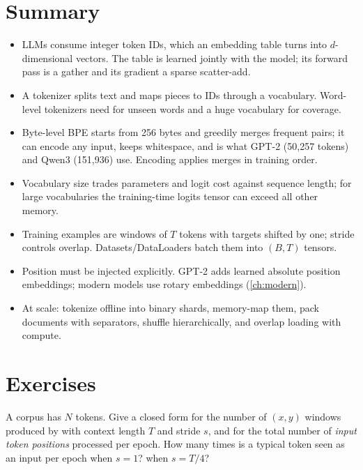 \section{Summary}\label{sec:text:summary}
\begin{itemize}
  \item LLMs consume integer token IDs, which an embedding table turns into $d$-dimensional vectors.
  The table is learned jointly with the model; its forward pass is a gather and its gradient a
  sparse scatter-add.
  \item A tokenizer splits text and maps pieces to IDs through a vocabulary. Word-level tokenizers
  need  for unseen words and a huge vocabulary for coverage.
  \item Byte-level BPE starts from 256 bytes and greedily merges frequent pairs; it can encode any
  input, keeps whitespace, and is what GPT-2 (50{,}257 tokens) and Qwen3 (151{,}936) use.
  Encoding applies merges in training order.
  \item Vocabulary size trades parameters and logit cost against sequence length; for large
  vocabularies the training-time logits tensor can exceed all other memory.
  \item Training examples are windows of $T$ tokens with targets shifted by one; stride controls
  overlap. Datasets/DataLoaders batch them into $(B,T)$ tensors.
  \item Position must be injected explicitly. GPT-2 adds learned absolute position embeddings;
  modern models use rotary embeddings (\cref{ch:modern}).
  \item At scale: tokenize offline into binary shards, memory-map them, pack documents with
  separators, shuffle hierarchically, and overlap loading with compute.
\end{itemize}

\section{Exercises}\label{sec:text:exercises}

\begin{exercise}
A corpus has $N$ tokens. Give a closed form for the number of $(x,y)$ windows produced by
 with context length $T$ and stride $s$, and for the total number of
\emph{input token positions} processed per epoch. How many times is a typical token seen as an input
per epoch when $s=1$? when $s=T/4$?
\end{exercise}

